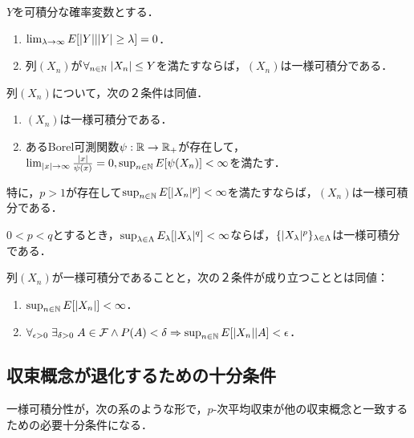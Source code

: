 \documentclass[uplatex,dvipdfmx]{jsreport}
\begin{document}
\begin{lemma}[一様可積分性の十分条件]
    $Y$を可積分な確率変数とする．
    \begin{enumerate}
        \item $\lim_{\lambda\to\infty}E[\lvert Y\rvert|\lvert Y\rvert\ge\lambda]=0$．
        \item 列$(X_n)$が$\forall_{n\in\mathbb{N}}\;\lvert X_n\rvert\le Y$を満たすならば，$(X_n)$は一様可積分である．
    \end{enumerate}
\end{lemma}

\begin{lemma}[一様可積分性の特徴付け]
    列$(X_n)$について，次の２条件は同値．
    \begin{enumerate}
        \item $(X_n)$は一様可積分である．
        \item あるBorel可測関数$\psi:\mathbb{R}\to\mathbb{R}_+$が存在して，$\lim_{\lvert x\rvert\to\infty}\frac{\lvert x\rvert}{\psi(x)}=0,\sup_{n\in\mathbb{N}}E[\psi(X_n)]<\infty$を満たす．
    \end{enumerate}
    特に，$p>1$が存在して$\sup_{n\in\mathbb{N}}E[\lvert X_n\rvert^p]<\infty$を満たすならば，$(X_n)$は一様可積分である．
\end{lemma}

\begin{corollary}
    $0<p<q$とするとき，$\sup_{\lambda\in\Lambda}E_\lambda[\lvert X_\lambda\rvert^q]<\infty$ならば，$\{\lvert X_\lambda\rvert^p\}_{\lambda\in\Lambda}$は一様可積分である．
\end{corollary}

\begin{lemma}[一様可積分性の特徴付け]
    列$(X_n)$が一様可積分であることと，次の２条件が成り立つこととは同値：
    \begin{enumerate}
        \item $\sup_{n\in\mathbb{N}}E[\lvert X_n\rvert]<\infty$．
        \item $\forall_{\epsilon>0}\;\exists_{\delta>0}\;A\in\mathcal{F}\land P(A)<\delta\Rightarrow\sup_{n\in\mathbb{N}}E[\lvert X_n\rvert|A]<\epsilon$．
    \end{enumerate}
\end{lemma}

\subsection{収束概念が退化するための十分条件}

\begin{tcolorbox}[colframe=ForestGreen, colback=ForestGreen!10!white,breakable,colbacktitle=ForestGreen!40!white,coltitle=black,fonttitle=\bfseries\sffamily,
title=]
    一様可積分性が，次の系のような形で，$p$-次平均収束が他の収束概念と一致するための必要十分条件になる．
\end{tcolorbox}
\end{document}
